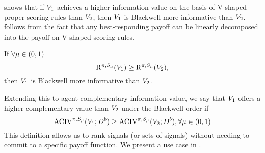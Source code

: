  shows that if $V_1$ achieves a higher information value on the basis of V-shaped proper scoring rules than $V_2$, then $V_1$ is Blackwell more informative than $V_2$.  follows from the fact that any best-responding payoff can be linearly decomposed into the payoff on V-shaped scoring rules. 

\begin{proposition}
\label{prop: blackwell-V-test}
If \(\forall \mu\in (0, 1)\) \begin{equation*}
    \mathrm{R}^{\pi, S_\mu}
(V_1)\geq \mathrm{R}^{\pi, S_\mu}
(V_2),
\end{equation*}
then $V_1$ is Blackwell more informative than $V_2$.
\end{proposition}

 \mvspace{-2mm}

Extending this to agent-complementary information value, we say that $V_1$ offers a higher complementary value than $V_2$ under the Blackwell order if 
\[\operatorname{ACIV}^{\pi, S_\mu}(V_1; D^b) \geq \operatorname{ACIV}^{\pi, S_\mu}(V_2; D^b), \forall \mu\in(0,1)\]
This definition allows us to rank signals (or sets of signals) without needing to commit to a specific payoff function. 
We present a use case in .
